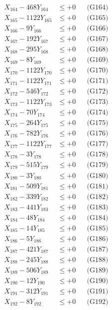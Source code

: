 \documentclass[a4paper,10pt]{article}
\begin{document}
{\begin{align}
X_{164} - 468Y_{164} &\leq +0 && \text{(G164)} \\
X_{165} - 1122Y_{165} &\leq +0 && \text{(G165)} \\
X_{166} - 9Y_{166} &\leq +0 && \text{(G166)} \\
X_{167} - 192Y_{167} &\leq +0 && \text{(G167)} \\
X_{168} - 295Y_{168} &\leq +0 && \text{(G168)} \\
X_{169} - 8Y_{169} &\leq +0 && \text{(G169)} \\
X_{170} - 1122Y_{170} &\leq +0 && \text{(G170)} \\
\allowbreak
X_{171} - 1122Y_{171} &\leq +0 && \text{(G171)} \\
X_{172} - 546Y_{172} &\leq +0 && \text{(G172)} \\
X_{173} - 1122Y_{173} &\leq +0 && \text{(G173)} \\
X_{174} - 70Y_{174} &\leq +0 && \text{(G174)} \\
X_{175} - 264Y_{175} &\leq +0 && \text{(G175)} \\
X_{176} - 782Y_{176} &\leq +0 && \text{(G176)} \\
X_{177} - 1122Y_{177} &\leq +0 && \text{(G177)} \\
X_{178} - 3Y_{178} &\leq +0 && \text{(G178)} \\
X_{179} - 515Y_{179} &\leq +0 && \text{(G179)} \\
X_{180} - 3Y_{180} &\leq +0 && \text{(G180)} \\
\allowbreak
X_{181} - 509Y_{181} &\leq +0 && \text{(G181)} \\
X_{182} - 339Y_{182} &\leq +0 && \text{(G182)} \\
X_{183} - 441Y_{183} &\leq +0 && \text{(G183)} \\
X_{184} - 48Y_{184} &\leq +0 && \text{(G184)} \\
X_{185} - 14Y_{185} &\leq +0 && \text{(G185)} \\
X_{186} - 5Y_{186} &\leq +0 && \text{(G186)} \\
X_{187} - 421Y_{187} &\leq +0 && \text{(G187)} \\
X_{188} - 245Y_{188} &\leq +0 && \text{(G188)} \\
X_{189} - 506Y_{189} &\leq +0 && \text{(G189)} \\
X_{190} - 12Y_{190} &\leq +0 && \text{(G190)} \\
\allowbreak
X_{191} - 312Y_{191} &\leq +0 && \text{(G191)} \\
X_{192} - 8Y_{192} &\leq +0 && \text{(G192)} \\

\end{align}}
\end{document}
